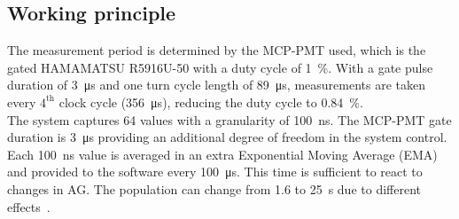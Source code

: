 \subsection{Working principle}
The measurement period is determined by the MCP-PMT used, which is the gated
HAMAMATSU R5916U-50 with a duty cycle of \SI{1}{\%}. With a gate pulse duration
of \SI{3}{\micro\second} and one turn cycle length of \SI{89}{\micro\second},
measurements are taken every $4^{\text{th}}$ clock cycle (\SI{356}{\micro\second}),
reducing the duty cycle to \SI{0.84}{\%}.\\
The system captures 64 values with a granularity of \SI{100}{\nano\second}. The
MCP-PMT gate duration is \SI{3}{\micro\second} providing an additional degree of
freedom in the system control. Each \SI{100}{\nano\second} value is averaged in an
extra Exponential Moving Average (EMA) and provided to the software every \SI{100}{\micro\second}. This
time is sufficient to react to changes in AG. The population can change from
1.6 to \SI{25}{\second} due to different
effects~\cite{high_sensitivity_measurement}.

